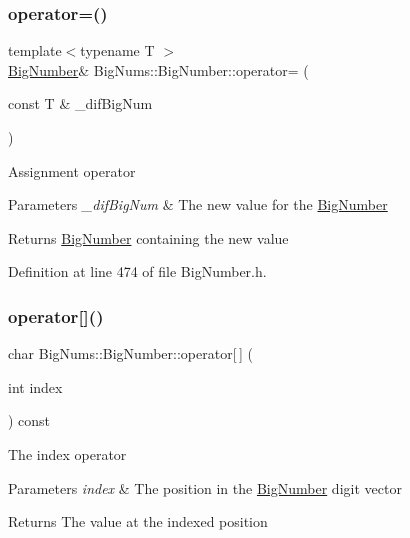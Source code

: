 \subsubsection{\texorpdfstring{operator=()}{operator=()}}
{\footnotesize\ttfamily template$<$typename T $>$ \\
\mbox{\hyperlink{class_big_nums_1_1_big_number}{Big\+Number}}\& Big\+Nums\+::\+Big\+Number\+::operator= (\begin{DoxyParamCaption}\item[{const T \&}]{\+\_\+dif\+Big\+Num }\end{DoxyParamCaption})\hspace{0.3cm}{\ttfamily [inline]}}

Assignment operator 
\begin{DoxyParams}{Parameters}
{\em \+\_\+dif\+Big\+Num} & The new value for the \mbox{\hyperlink{class_big_nums_1_1_big_number}{Big\+Number}} \\
\hline
\end{DoxyParams}
\begin{DoxyReturn}{Returns}
\mbox{\hyperlink{class_big_nums_1_1_big_number}{Big\+Number}} containing the new value 
\end{DoxyReturn}


Definition at line 474 of file Big\+Number.\+h.

\mbox{\label{class_big_nums_1_1_big_number_ab3ebd73a1b9d6719be452f05f9e2ebce}} 
\subsubsection{\texorpdfstring{operator[]()}{operator[]()}\hspace{0.1cm}{\footnotesize\ttfamily [1/2]}}
{\footnotesize\ttfamily char Big\+Nums\+::\+Big\+Number\+::operator\mbox{[}$\,$\mbox{]} (\begin{DoxyParamCaption}\item[{int}]{index }\end{DoxyParamCaption}) const}

The index operator 
\begin{DoxyParams}{Parameters}
{\em index} & The position in the \mbox{\hyperlink{class_big_nums_1_1_big_number}{Big\+Number}} digit vector \\
\hline
\end{DoxyParams}
\begin{DoxyReturn}{Returns}
The value at the indexed position 
\end{DoxyReturn}
\mbox{\label{class_big_nums_1_1_big_number_aa341f4a148c2d83057ccd78f7a048c41}} 
